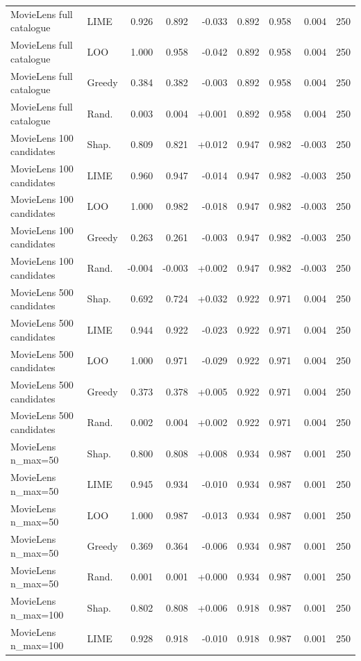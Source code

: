 \begin{table}[H]
\begin{tabular}{@{}llrrrrrrr@{}}
MovieLens full catalogue & LIME & 0.926 & 0.892 & -0.033 & 0.892 & 0.958 & 0.004 & 250 \\
MovieLens full catalogue & LOO & 1.000 & 0.958 & -0.042 & 0.892 & 0.958 & 0.004 & 250 \\
MovieLens full catalogue & Greedy & 0.384 & 0.382 & -0.003 & 0.892 & 0.958 & 0.004 & 250 \\
MovieLens full catalogue & Rand. & 0.003 & 0.004 & +0.001 & 0.892 & 0.958 & 0.004 & 250 \\
MovieLens 100 candidates & Shap. & 0.809 & 0.821 & +0.012 & 0.947 & 0.982 & -0.003 & 250 \\
MovieLens 100 candidates & LIME & 0.960 & 0.947 & -0.014 & 0.947 & 0.982 & -0.003 & 250 \\
MovieLens 100 candidates & LOO & 1.000 & 0.982 & -0.018 & 0.947 & 0.982 & -0.003 & 250 \\
MovieLens 100 candidates & Greedy & 0.263 & 0.261 & -0.003 & 0.947 & 0.982 & -0.003 & 250 \\
MovieLens 100 candidates & Rand. & -0.004 & -0.003 & +0.002 & 0.947 & 0.982 & -0.003 & 250 \\
MovieLens 500 candidates & Shap. & 0.692 & 0.724 & +0.032 & 0.922 & 0.971 & 0.004 & 250 \\
MovieLens 500 candidates & LIME & 0.944 & 0.922 & -0.023 & 0.922 & 0.971 & 0.004 & 250 \\
MovieLens 500 candidates & LOO & 1.000 & 0.971 & -0.029 & 0.922 & 0.971 & 0.004 & 250 \\
MovieLens 500 candidates & Greedy & 0.373 & 0.378 & +0.005 & 0.922 & 0.971 & 0.004 & 250 \\
MovieLens 500 candidates & Rand. & 0.002 & 0.004 & +0.002 & 0.922 & 0.971 & 0.004 & 250 \\
MovieLens n\_max=50 & Shap. & 0.800 & 0.808 & +0.008 & 0.934 & 0.987 & 0.001 & 250 \\
MovieLens n\_max=50 & LIME & 0.945 & 0.934 & -0.010 & 0.934 & 0.987 & 0.001 & 250 \\
MovieLens n\_max=50 & LOO & 1.000 & 0.987 & -0.013 & 0.934 & 0.987 & 0.001 & 250 \\
MovieLens n\_max=50 & Greedy & 0.369 & 0.364 & -0.006 & 0.934 & 0.987 & 0.001 & 250 \\
MovieLens n\_max=50 & Rand. & 0.001 & 0.001 & +0.000 & 0.934 & 0.987 & 0.001 & 250 \\
MovieLens n\_max=100 & Shap. & 0.802 & 0.808 & +0.006 & 0.918 & 0.987 & 0.001 & 250 \\
MovieLens n\_max=100 & LIME & 0.928 & 0.918 & -0.010 & 0.918 & 0.987 & 0.001 & 250 \\

\end{tabular}
\end{table}
